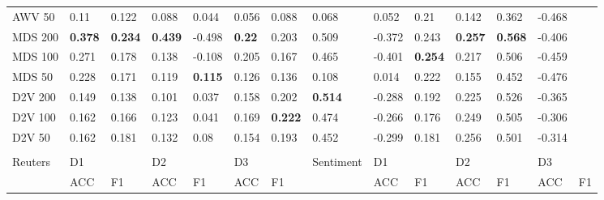 \begin{landscape}
\begin{table}[]
\begin{tabular}{llllllllllllll}
		AWV 50     & 0.11           & 0.122          & 0.088          & 0.044          & 0.056          & 0.088          & 0.068          & 0.052          & 0.21           & 0.142          & 0.362          & -0.468         &                \\
		MDS 200    & \textbf{0.378} & \textbf{0.234} & \textbf{0.439} & -0.498         & \textbf{0.22}  & 0.203          & 0.509          & -0.372         & 0.243          & \textbf{0.257} & \textbf{0.568} & -0.406         &                \\
		MDS 100    & 0.271          & 0.178          & 0.138          & -0.108         & 0.205          & 0.167          & 0.465          & -0.401         & \textbf{0.254} & 0.217          & 0.506          & -0.459         &                \\
		MDS 50     & 0.228          & 0.171          & 0.119          & \textbf{0.115} & 0.126          & 0.136          & 0.108          & 0.014          & 0.222          & 0.155          & 0.452          & -0.476         &                \\
		D2V 200    & 0.149          & 0.138          & 0.101          & 0.037          & 0.158          & 0.202          & \textbf{0.514} & -0.288         & 0.192          & 0.225          & 0.526          & -0.365         &                \\
		D2V 100    & 0.162          & 0.166          & 0.123          & 0.041          & 0.169          & \textbf{0.222} & 0.474          & -0.266         & 0.176          & 0.249          & 0.505          & -0.306         &                \\
		D2V 50     & 0.162          & 0.181          & 0.132          & 0.08           & 0.154          & 0.193          & 0.452          & -0.299         & 0.181          & 0.256          & 0.501          & -0.314         &                \\
		&                &                &                &                &                &                &                &                &                &                &                &                &                \\
		Reuters    & D1             &                & D2             &                & D3             &                & Sentiment      & D1             &                & D2             &                & D3             &                \\
		& ACC            & F1             & ACC            & F1             & ACC            & F1             &                & ACC            & F1             & ACC            & F1             & ACC            & F1             \\

\end{tabular}
\end{table}
\end{landscape}
